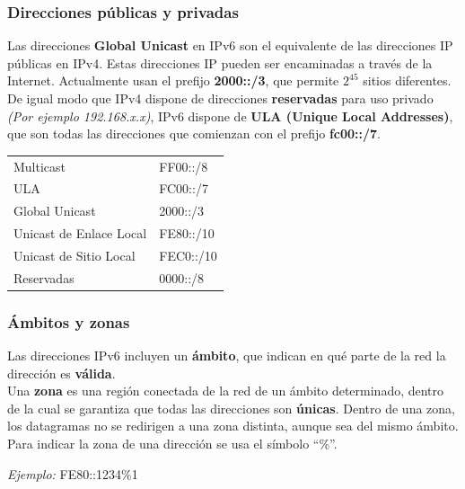 \begin{onepage}
\end{onepage}\begin{onepage}
\subsubsection{Direcciones públicas y privadas}
Las direcciones \textbf{Global Unicast} en IPv6 son el equivalente de las direcciones IP públicas en IPv4. Estas direcciones IP pueden ser encaminadas a través de la Internet. Actualmente usan el prefijo \textbf{2000::/3}, que permite $2^{45}$ sitios diferentes.\\


De igual modo que IPv4 dispone de direcciones \textbf{reservadas} para uso privado \textit{(Por ejemplo 192.168.x.x)}, IPv6 dispone de \textbf{ULA (Unique Local Addresses)}, que son todas las direcciones que comienzan con el prefijo \textbf{fc00::/7}.

\begin{table}[H]\centering\begin{tabular}{ll}
Multicast               & FF00::/8  \\
ULA                     & FC00::/7  \\
Global Unicast          & 2000::/3  \\
Unicast de Enlace Local & FE80::/10 \\
Unicast de Sitio Local  & FEC0::/10 \\
Reservadas              & 0000::/8 
\end{tabular}\end{table}

\subsubsection{Ámbitos y zonas}
Las direcciones IPv6 incluyen un \textbf{ámbito}, que indican en qué parte de la red la dirección es \textbf{válida}.\\

Una \textbf{zona} es una región conectada de la red de un ámbito determinado, dentro de la cual se garantiza que todas las direcciones son \textbf{únicas}. Dentro de una zona, los datagramas no se redirigen a una zona distinta, aunque sea del mismo ámbito. Para indicar la zona de una dirección se usa el símbolo \enquote{\%}.
\begin{center}
    \textit{Ejemplo: }FE80::1234\%1
\end{center}
\end{onepage}

